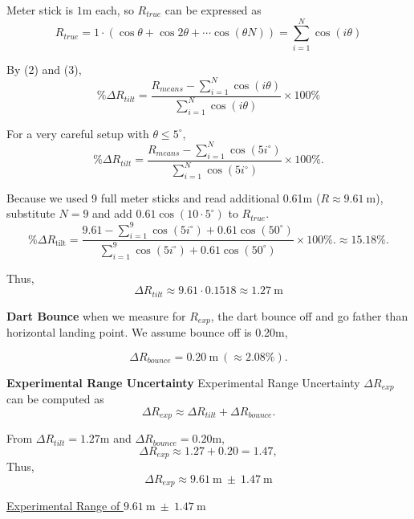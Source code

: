 \documentclass[12pt]{article}
\begin{document}
Meter stick is $1\mathrm{m}$ each, so $R_{true}$ can be expressed as
\[
R_{true}=1\cdot(\cos \theta+\cos 2\theta+\cdots \cos (\theta N))=\sum_{i=1}^{N} \cos\!\left(i\theta\right)
\tag{3}
\]

By (2) and (3),
\[
\%\Delta R_{tilt} = \frac{R_{means}-\sum_{i=1}^{N} \cos\!\left(i\theta\right)}{\sum_{i=1}^{N} \cos\!\left(i\theta\right)}\times 100\%
\]
\vspace{1em}

For a very careful setup with $\theta\le 5^\circ$,
\[
\%\Delta R_{tilt} = 
\frac{R_{means}-\sum_{i=1}^{N} \cos\!\left(5i^{\circ}\right)}{\sum_{i=1}^{N} \cos\!\left(5i^{\circ}\right)}\times 100\%.
\]
\vspace{1em}

Because we used 9 full meter sticks and read additional 0.61m ($R\approx 9.61~\mathrm{m}$), substitute $N=9$ and add $0.61\cos(10\cdot5^{\circ})$ to $R_{true}$.
\vspace{1em}
\[
\%\Delta R_{\text{tilt}} 
=
\frac{9.61-\sum_{i=1}^{9} \cos\!\left(5i^{\circ}\right)+0.61\cos(50^{\circ})}{\sum_{i=1}^{9} \cos\!\left(5i^{\circ}\right)+0.61\cos(50^{\circ})}\times 100\%.
\approx\boxed{15.18\%}.
\]
\vspace{1em}

Thus,
\[
\Delta R_{tilt} \approx 9.61 \cdot 0.1518 \approx 1.27 \ \mathrm{m} 
\]

\vspace{1em}

\textbf{Dart Bounce} when we measure for $R_{exp}$, the dart bounce off and go father than horizontal landing point. We assume bounce off is 0.20m,

\[
\Delta R_{bounce}=0.20~\mathrm{m} \ (\approx2.08\%).
\]

\vspace{1em}

\textbf{Experimental Range Uncertainty}
Experimental Range Uncertainty $\Delta R_{exp}$ can be computed as
\vspace{1em}
\[
\Delta R_{exp} \approx \Delta R_{tilt} + \Delta R_{bounce}.
\]

\vspace{1em}
From $\Delta R_{tilt}=1.27\mathrm{m}$ and $\Delta R_{bounce}=0.20\mathrm{m}$,
\[
\Delta R_{exp} \approx 1.27 + 0.20 = 1.47,
\]
Thus,
\[
\Delta R_{exp} \approx {9.61~\mathrm{m}~\pm~1.47~\mathrm{m}}
\]

\vspace{1em}

\noindent\hfill\underline{
Experimental Range of $9.61~\mathrm{m} \ \pm\ 1.47~\mathrm{m}\quad\text{}$
}
\end{document}
